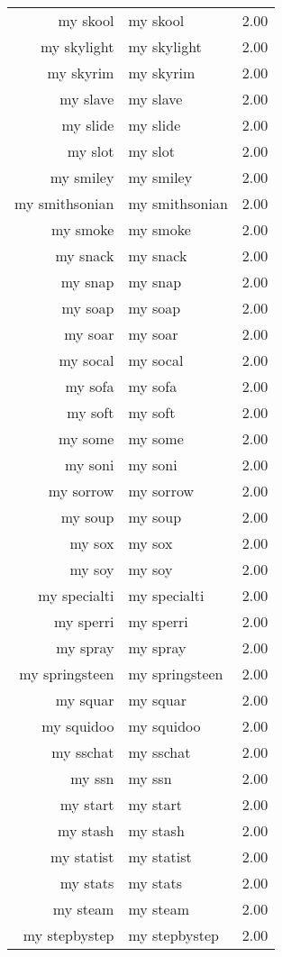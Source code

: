 \begin{table}[ht]
\begin{tabular}{rlr}
  my skool & my skool & 2.00 \\ 
  my skylight & my skylight & 2.00 \\ 
  my skyrim & my skyrim & 2.00 \\ 
  my slave & my slave & 2.00 \\ 
  my slide & my slide & 2.00 \\ 
  my slot & my slot & 2.00 \\ 
  my smiley & my smiley & 2.00 \\ 
  my smithsonian & my smithsonian & 2.00 \\ 
  my smoke & my smoke & 2.00 \\ 
  my snack & my snack & 2.00 \\ 
  my snap & my snap & 2.00 \\ 
  my soap & my soap & 2.00 \\ 
  my soar & my soar & 2.00 \\ 
  my socal & my socal & 2.00 \\ 
  my sofa & my sofa & 2.00 \\ 
  my soft & my soft & 2.00 \\ 
  my some & my some & 2.00 \\ 
  my soni & my soni & 2.00 \\ 
  my sorrow & my sorrow & 2.00 \\ 
  my soup & my soup & 2.00 \\ 
  my sox & my sox & 2.00 \\ 
  my soy & my soy & 2.00 \\ 
  my specialti & my specialti & 2.00 \\ 
  my sperri & my sperri & 2.00 \\ 
  my spray & my spray & 2.00 \\ 
  my springsteen & my springsteen & 2.00 \\ 
  my squar & my squar & 2.00 \\ 
  my squidoo & my squidoo & 2.00 \\ 
  my sschat & my sschat & 2.00 \\ 
  my ssn & my ssn & 2.00 \\ 
  my start & my start & 2.00 \\ 
  my stash & my stash & 2.00 \\ 
  my statist & my statist & 2.00 \\ 
  my stats & my stats & 2.00 \\ 
  my steam & my steam & 2.00 \\ 
  my stepbystep & my stepbystep & 2.00 \\ 

\end{tabular}
\end{table}
